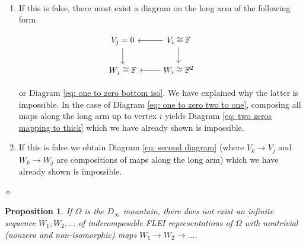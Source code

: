\documentclass{article}
\newtheorem{proposition}{Proposition}[section]
\newenvironment{proof}{\vspace*{2ex}\noindent {\em Proof:}
}{\hfill $\diamond$ \\[2ex]}
\begin{document}
\begin{proof}
\

\begin{enumerate}
\item If this is false, there must exist a diagram on the long arm of the following form

\begin{equation}\label{eq: one to zero two to one}
\begin{tikzcd}
V_j = 0 \arrow[d]  & V_i \cong \mathbb{F} \arrow[l]  \arrow[d] & 
\\ W_j \cong \mathbb{F} & W_i \cong \mathbb{F}^2 \arrow[l] 
\end{tikzcd}
\end{equation}

or Diagram \ref{eq: one to zero bottom iso}. We have explained why the latter is impossible. In the case of Diagram \ref{eq: one to zero two to one}, composing all maps along the long arm up to vertex $i$ yields Diagram \ref{eq: two zeros mapping to thick} which we have already shown is impossible. 

\item If this is false we obtain Diagram \ref{eq: second diagram} (where $V_k \to V_j$ and $W_k \to W_j$ are compositions of maps along the long arm) which we have already shown is impossible. 

\end{enumerate}
\end{proof}


\begin{proposition}\label{prop: no infinite sequence of non-trivial maps}
    If $\Omega$ is the $D_\infty$ mountain, there does not exist an infinite sequence $W_1, W_2, \ldots$ of indecomposable FLEI representations of $\Omega$ with nontrivial (nonzero and non-isomorphic) maps $W_1 \to W_2 \to \ldots$. 
\end{proposition} 
\end{document}
